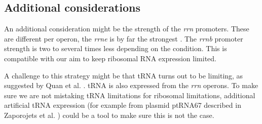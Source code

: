 \subsection{Additional considerations}

An additional consideration might be the strength of the \textit{rrn} promoters.
These are different per operon, the \textit{rrne} is by far the strongest \cite{Maeda2015}.
The \textit{rrnb} promoter strength is two to several times less depending on the condition.
This is compatible with our aim to keep ribosomal RNA expression limited.

A challenge to this strategy might be that 
tRNA turns out to be limiting, as suggested by Quan et al. \cite{Quan2015}.
tRNA is also expressed from the \textit{rrn} operons. To make sure we are not mistaking tRNA limitations for ribosomal limitations, additional artificial tRNA expression (for example from plasmid ptRNA67 described in Zaporojets et al. \cite{Zaporojets2003,Quan2015}) could be a tool to make sure this is not the case.



%

